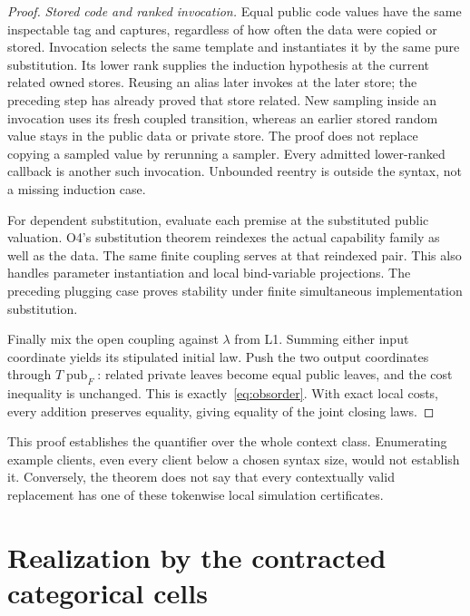 \documentclass[11pt,a4paper]{article}
\theoremstyle{definition}
\begin{document}
\begin{proof}
\emph{Stored code and ranked invocation.} Equal public code values have
the same inspectable tag and captures, regardless of how often the data
were copied or stored. Invocation selects the same template and
instantiates it by the same pure substitution. Its lower rank supplies
the induction hypothesis at the current related owned stores. Reusing an
alias later invokes at the later store; the preceding step has already
proved that store related. New sampling inside an invocation uses its
fresh coupled transition, whereas an earlier stored random value stays
in the public data or private store. The proof does not replace copying
a sampled value by rerunning a sampler. Every admitted lower-ranked
callback is another such invocation. Unbounded reentry is outside the
syntax, not a missing induction case.

For dependent substitution, evaluate each premise at the substituted
public valuation. O4's substitution theorem reindexes the actual
capability family as well as the data. The same finite coupling serves
at that reindexed pair. This also handles parameter instantiation and
local bind-variable projections. The preceding plugging case proves
stability under finite simultaneous implementation substitution.

Finally mix the open coupling against $\lambda$ from L1. Summing either
input coordinate yields its stipulated initial law. Push the two output
coordinates through $T\operatorname{pub}_F$: related private leaves
become equal public leaves, and the cost inequality is unchanged. This
is exactly~\eqref{eq:obsorder}. With exact local costs, every addition
preserves equality, giving equality of the joint closing laws.
\end{proof}
This proof establishes the quantifier over the whole context class.
Enumerating example clients, even every client below a chosen syntax
size, would not establish it. Conversely, the theorem does not say that
every contextually valid replacement has one of these tokenwise local
simulation certificates.

\section{Realization by the contracted categorical cells}\label{sec:cells}
\end{document}
